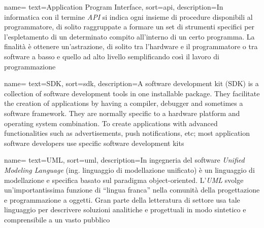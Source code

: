 


 {
    name=
    text=Application Program Interface,
    sort=api,
    description={In informatica con il termine \emph{API} si indica ogni insieme di procedure disponibili al programmatore, di solito raggruppate a formare un set di strumenti specifici per l'espletamento di un determinato compito all'interno di un certo programma. La finalità è ottenere un'astrazione, di solito tra l'hardware e il programmatore o tra software a basso e quello ad alto livello semplificando così il lavoro di programmazione}
}

 {
    name=
    text=SDK,
    sort=sdk,
    description={A software development kit (SDK) is a collection of software development tools in one installable package. They facilitate the creation of applications by having a compiler, debugger and sometimes a software framework. They are normally specific to a hardware platform and operating system combination. To create applications with advanced functionalities such as advertisements, push notifications, etc; most application software developers use specific software development kits}
}

 {
    name=
    text=UML,
    sort=uml,
    description={In ingegneria del software \emph{Unified Modeling Language} (ing. linguaggio di modellazione unificato) è un linguaggio di modellazione e specifica basato sul paradigma object-oriented. L'\emph{UML} svolge un'importantissima funzione di ``lingua franca'' nella comunità della progettazione e programmazione a oggetti. Gran parte della letteratura di settore usa tale linguaggio per descrivere soluzioni analitiche e progettuali in modo sintetico e comprensibile a un vasto pubblico}
}


